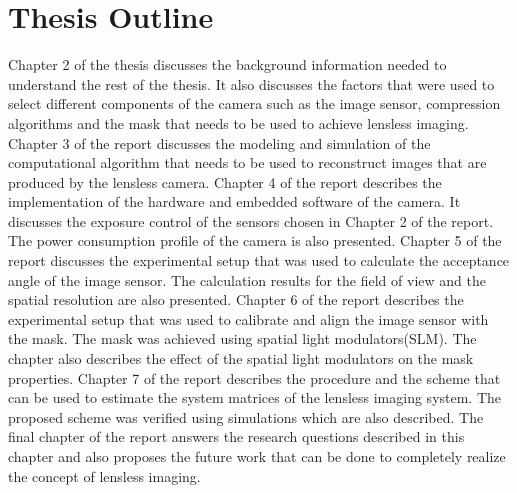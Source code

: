 \section{Thesis Outline}
Chapter 2 of the thesis discusses the background information needed to understand the rest of the thesis. It also discusses the factors that were used to select different components of the camera such as the image sensor, compression algorithms and the mask that needs to be used to achieve lensless imaging. Chapter 3 of the report discusses the modeling and simulation of the computational algorithm that needs to be used to reconstruct images that are produced by the lensless camera. Chapter 4 of the report describes the implementation of the hardware and embedded software of the camera. It discusses the exposure control of the sensors chosen in Chapter 2 of the report. The power consumption profile of the camera is also presented. Chapter 5 of the report discusses the experimental setup that was used to calculate the acceptance angle of the image sensor. The calculation results for the field of view and the spatial resolution are also presented. Chapter 6 of the report describes the experimental setup that was used to calibrate and align the image sensor with the mask. The mask was achieved using spatial light modulators(SLM). The chapter also describes the effect of the spatial light modulators on the mask properties. Chapter 7 of the report describes the procedure and the scheme that can be used to estimate the system matrices of the lensless imaging system. The proposed scheme was verified using simulations which are also described. The final chapter of the report answers the research questions described in this chapter and also proposes the future work that can be done to completely realize the concept of lensless imaging. 


